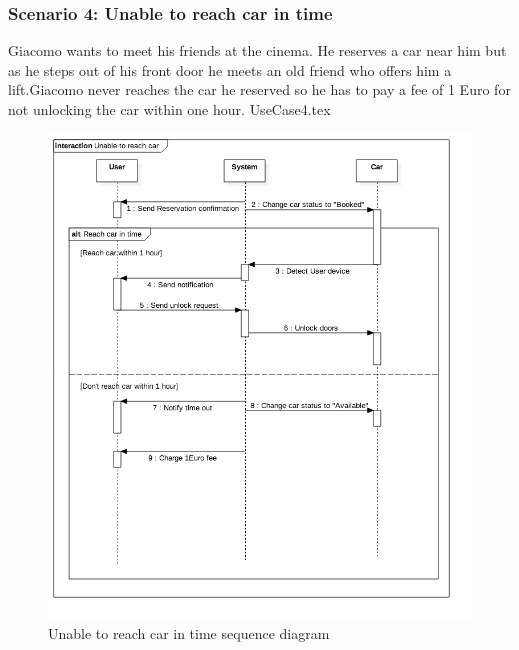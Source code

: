 \documentclass[12pt]{article}
\begin{document}
		\subsubsection{Scenario 4: Unable to reach car in time}
		Giacomo wants to meet his friends at the cinema. He reserves a car near him but as he 
		steps out of his front door he meets an old friend who offers him a lift.Giacomo
		never reaches the car he reserved so he has to pay a fee of 1 Euro for not unlocking
		the car within one hour.
		\FloatBarrier
		{UseCase4.tex}
		\newpage
		\begin{figure}[htbp]
		 \caption{Unable to reach car in time sequence diagram}
		\includegraphics[scale=0.49]{Images/SequenceDiagram/Unable.png}
 	 	\end{figure}
 	 	\clearpage
		
\end{document}
